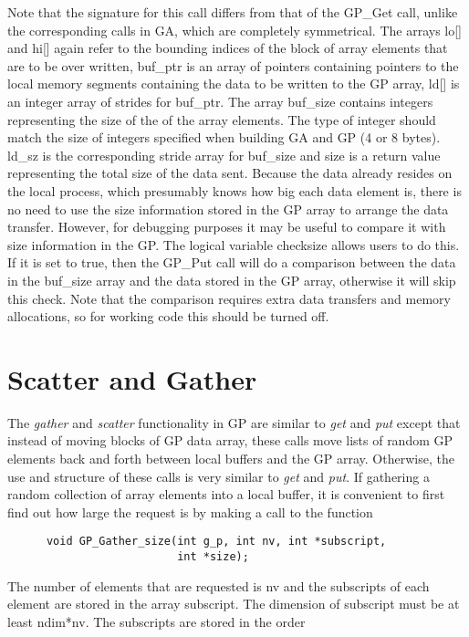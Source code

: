 \noindent
Note that the signature for this call differs from that of the GP\_Get call,
unlike the corresponding calls in GA, which are completely symmetrical. The
arrays lo[] and hi[] again refer to the bounding indices of the block of array
elements that are to be over written, buf\_ptr is an array of pointers
containing pointers to the local memory segments containing the data to be
written to the GP array, ld[] is an integer array of strides for buf\_ptr. The
array buf\_size contains integers representing the size of the of the array
elements. The type of integer should match the size of integers specified when
building GA and GP (4 or 8 bytes). ld\_sz is the corresponding stride array for
buf\_size and size is a return value representing the total size of the data
sent. Because the data already resides on the local process, which presumably
knows how big each data element is, there is no need to use the size information
stored in the GP array to arrange the data transfer. However,
for debugging purposes it may be useful to compare it with size information in
the GP. The logical variable checksize allows users to do this. If it is set to
true, then the GP\_Put call will do a comparison between the data in the
buf\_size array and the data stored in the GP array, otherwise it will skip this
check. Note that the comparison requires extra data transfers and memory
allocations, so for working code this should be turned off.

\section{Scatter and Gather}

The \emph{gather} and \emph{scatter} functionality in GP are similar to
\emph{get} and \emph{put} except that instead of moving blocks of GP data array,
these calls move lists of random GP elements back and forth between local
buffers and the GP array. Otherwise, the use and structure of these calls is
very similar to \emph{get} and \emph{put}. If gathering a random collection of
array elements into a local buffer, it is convenient to first find out how large
the request is by making a call to the function

\begin{verbatim}
      void GP_Gather_size(int g_p, int nv, int *subscript,
                          int *size);
\end{verbatim}

\noindent
The number of elements that are requested is nv and the subscripts of each
element are stored in the array subscript. The dimension of subscript must be at
least ndim*nv. The subscripts are stored in the order


